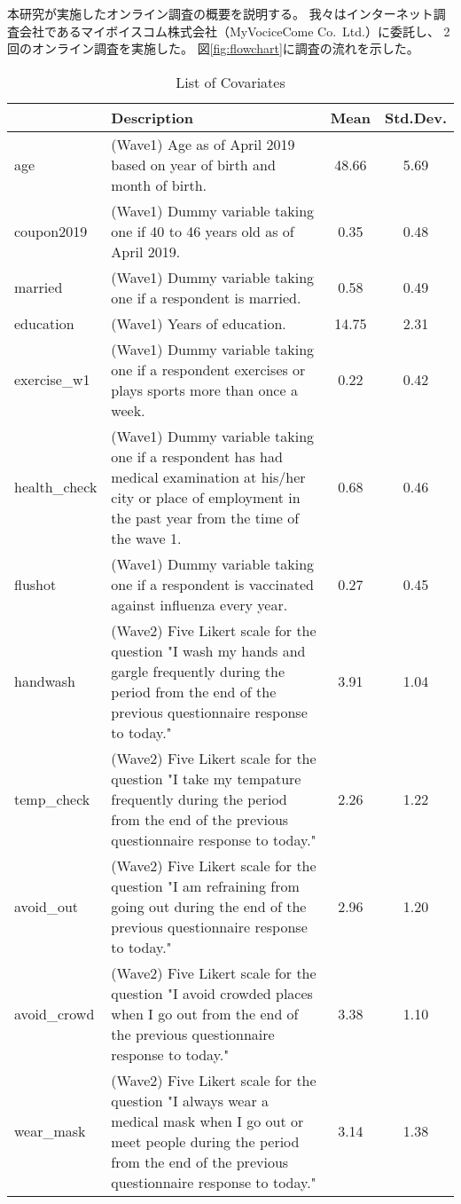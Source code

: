 \documentclass[
  11pt,
  a4paper,
]{article}
\begin{document}
本研究が実施したオンライン調査の概要を説明する。
我々はインターネット調査会社であるマイボイスコム株式会社（MyVociceCome Co.~Ltd.）に委託し、
2回のオンライン調査を実施した。
図\ref{fig:flowchart}に調査の流れを示した。

\begin{table}[!h]

\caption{\label{tab:covlist}List of Covariates}
\centering
\fontsize{9}{11}\selectfont
\begin{tabular}[t]{l>{\raggedright\arraybackslash}p{30em}cc}
\toprule
  & Description & Mean & Std.Dev.\\
\midrule
age & (Wave1) Age as of April 2019 based on year of birth and month of birth. & 48.66 & 5.69\\
coupon2019 & (Wave1) Dummy variable taking one if 40 to 46 years old as of April 2019. & 0.35 & 0.48\\
married & (Wave1) Dummy variable taking one if a respondent is married. & 0.58 & 0.49\\
education & (Wave1) Years of education. & 14.75 & 2.31\\
exercise\_w1 & (Wave1) Dummy variable taking one if a respondent exercises or plays sports more than once a week. & 0.22 & 0.42\\
health\_check & (Wave1) Dummy variable taking one if a respondent has had medical examination at his/her city or place of employment in the past year from the time of the wave 1. & 0.68 & 0.46\\
flushot & (Wave1) Dummy variable taking one if a respondent is vaccinated against influenza every year. & 0.27 & 0.45\\
handwash & (Wave2) Five Likert scale for the question "I wash my hands and gargle frequently during the period from the end of the previous questionnaire response to today." & 3.91 & 1.04\\
temp\_check & (Wave2) Five Likert scale for the question "I take my tempature frequently during the period from the end of the previous questionnaire response to today." & 2.26 & 1.22\\
avoid\_out & (Wave2) Five Likert scale for the question "I am refraining from going out during the end of the previous questionnaire response to today." & 2.96 & 1.20\\
avoid\_crowd & (Wave2) Five Likert scale for the question "I avoid crowded places when I go out from the end of the previous questionnaire response to today." & 3.38 & 1.10\\
wear\_mask & (Wave2) Five Likert scale for the question "I always wear a medical mask when I go out or meet people during the period from the end of the previous questionnaire response to today." & 3.14 & 1.38\\
\bottomrule
\end{tabular}
\end{table}
\end{document}
